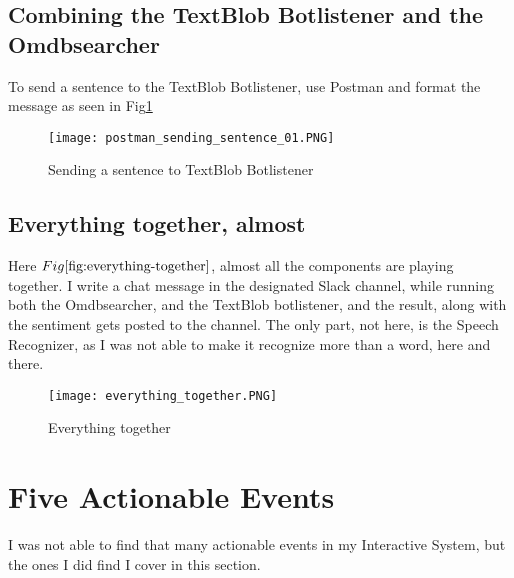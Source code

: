 \documentclass[11pt,fleqn]{book} %
\begin{document}
\section{Combining the TextBlob Botlistener and the Omdbsearcher}
To send a sentence to the TextBlob Botlistener, use Postman and format the message as seen in Fig\ref{fig:sending-botlistener}
\begin{figure}[]
  \centering
   \texttt{[image: postman\_sending\_sentence\_01.PNG]}
  \caption{Sending a sentence to TextBlob Botlistener}
  \label{fig:sending-botlistener}
\end{figure}

\newpage
\section{Everything together, almost}
Here \(Fig\ref{fig:everything-together}\), almost all the components are playing together. I write a chat message in the designated Slack channel, while running both the Omdbsearcher, and the TextBlob botlistener, and the result, along with the sentiment gets posted to the channel.
The only part, not here, is the Speech Recognizer, as I was not able to make it recognize more than a word, here and there.

\begin{figure}[]
  \centering
   \texttt{[image: everything\_together.PNG]}
  \caption{Everything together}
  \label{fig:everything-together}
\end{figure}


\chapter{Five Actionable Events}
I was not able to find that many actionable events in my Interactive System, but the ones I did find I cover in this section.
\section{}

\end{document}
